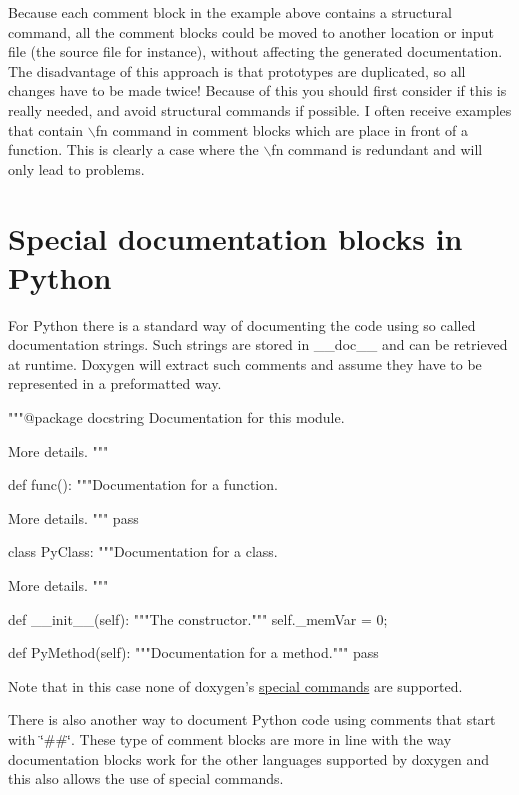 Because each comment block in the example above contains a structural command, all the comment blocks could be moved to another location or input file (the source file for instance), without affecting the generated documentation. The disadvantage of this approach is that prototypes are duplicated, so all changes have to be made twice! Because of this you should first consider if this is really needed, and avoid structural commands if possible. I often receive examples that contain $\backslash$fn command in comment blocks which are place in front of a function. This is clearly a case where the $\backslash$fn command is redundant and will only lead to problems.\hypertarget{docblocks_pythonblocks}{}\section{Special documentation blocks in Python}\label{docblocks_pythonblocks}
For Python there is a standard way of documenting the code using so called documentation strings. Such strings are stored in {\ttfamily \_\-\_\-doc\_\-\_\-} and can be retrieved at runtime. Doxygen will extract such comments and assume they have to be represented in a preformatted way.


\begin{DoxyCodeInclude}
"""@package docstring
Documentation for this module.

More details.
"""

def func():
    """Documentation for a function.

    More details.
    """
    pass

class PyClass:
    """Documentation for a class.

    More details.
    """
   
    def __init__(self):
        """The constructor."""
        self._memVar = 0;
   
    def PyMethod(self):
        """Documentation for a method."""
        pass
     
\end{DoxyCodeInclude}
 

Note that in this case none of doxygen's \hyperlink{commands_cmd_intro}{special commands} are supported.

There is also another way to document Python code using comments that start with \char`\"{}\#\#\char`\"{}. These type of comment blocks are more in line with the way documentation blocks work for the other languages supported by doxygen and this also allows the use of special commands.


